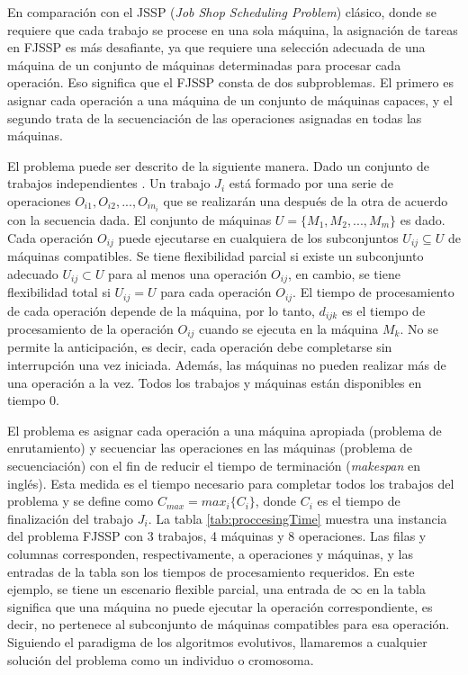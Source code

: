 En comparación con el JSSP (\textit{Job Shop Scheduling Problem}) clásico, donde se requiere que cada trabajo se procese en una sola máquina, la asignación de tareas en FJSSP es más desafiante, ya que requiere una selección adecuada de una máquina de un conjunto de máquinas determinadas para procesar cada operación. Eso significa que el FJSSP consta de dos subproblemas. El primero es asignar cada operación a una máquina de un conjunto de máquinas capaces, y el segundo trata de la secuenciación de las operaciones asignadas en todas las máquinas.


El problema puede ser descrito de la siguiente manera. Dado un conjunto de trabajos independientes . Un trabajo $J_i$ está formado por una serie de operaciones $O_{i1},O_{i2}, . . . , O_{in_i}$ que se realizarán una después de la otra de acuerdo con la secuencia dada. El conjunto de máquinas $U = \{M_1,M_2, . . . , M_m\}$ es dado. Cada operación $O_{ij}$ puede ejecutarse en cualquiera de los subconjuntos $U_{ij} \subseteq U$ de máquinas compatibles. Se tiene flexibilidad parcial si existe un subconjunto adecuado $U_{ij} \subset U$ para al menos una operación $O_{ij}$, en cambio, se tiene flexibilidad total si $U_{ij} =U$ para cada operación $O_{ij}$. El tiempo de procesamiento de cada operación depende de la máquina, por lo tanto, $d_{ijk}$ es el tiempo de procesamiento de la operación $O_{ij}$ cuando se ejecuta en la máquina $M_k$. No se permite la anticipación, es decir, cada operación debe completarse sin interrupción una vez iniciada. Además, las máquinas no pueden realizar más de una operación a la vez. Todos los trabajos y máquinas están disponibles en tiempo 0.


El problema es asignar cada operación a una máquina apropiada (problema de enrutamiento) y secuenciar las operaciones en las máquinas (problema de secuenciación) con el fin de reducir el tiempo de terminación (\textit{makespan} en inglés). Esta medida es el tiempo necesario para completar todos los trabajos del problema y se define como $C_{max} =max_i\{C_i\}$, donde $C_i$ es el tiempo de finalización del trabajo $J_i$. La tabla \ref{tab:proccesingTime} muestra una instancia del problema FJSSP con 3 trabajos, 4 máquinas y 8 operaciones. Las filas y columnas corresponden, respectivamente, a operaciones y máquinas, y las entradas de la tabla son los tiempos de procesamiento requeridos. En este ejemplo, se tiene un escenario flexible parcial, una entrada de $\infty$ en la tabla significa que una máquina no puede ejecutar la operación correspondiente, es decir, no pertenece al subconjunto de máquinas compatibles para esa operación. Siguiendo el paradigma de los algoritmos evolutivos, llamaremos a cualquier solución del problema como un individuo o cromosoma.


